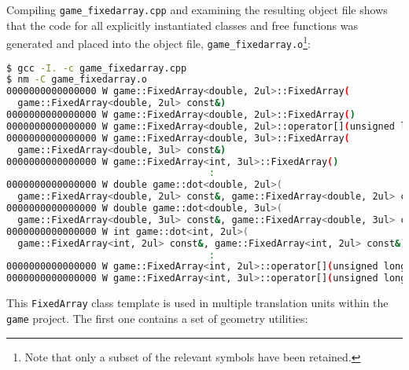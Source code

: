 \noindent Compiling \lstinline!game_fixedarray.cpp! and examining the resulting
object file shows that the code for all explicitly instantiated classes
and free functions was generated and placed into the object file,
\lstinline!game_fixedarray.o!{\cprotect\footnote{Note that only a subset
  of the relevant symbols have been retained.}}:

\begin{lstlisting}[language=bash]
$ gcc -I. -c game_fixedarray.cpp
$ nm -C game_fixedarray.o
0000000000000000 W game::FixedArray<double, 2ul>::FixedArray(
  game::FixedArray<double, 2ul> const&)
0000000000000000 W game::FixedArray<double, 2ul>::FixedArray()
0000000000000000 W game::FixedArray<double, 2ul>::operator[](unsigned long)
0000000000000000 W game::FixedArray<double, 3ul>::FixedArray(
  game::FixedArray<double, 3ul> const&)
0000000000000000 W game::FixedArray<int, 3ul>::FixedArray()
                                    :
0000000000000000 W double game::dot<double, 2ul>(
  game::FixedArray<double, 2ul> const&, game::FixedArray<double, 2ul> const&)
0000000000000000 W double game::dot<double, 3ul>(
  game::FixedArray<double, 3ul> const&, game::FixedArray<double, 3ul> const&)
0000000000000000 W int game::dot<int, 2ul>(
  game::FixedArray<int, 2ul> const&, game::FixedArray<int, 2ul> const&)
                                    :
0000000000000000 W game::FixedArray<int, 2ul>::operator[](unsigned long) const
0000000000000000 W game::FixedArray<int, 3ul>::operator[](unsigned long) const
\end{lstlisting}

\noindent This \lstinline!FixedArray! class template is used in multiple translation
units within the \lstinline!game! project. The first one contains a set
of geometry utilities:

